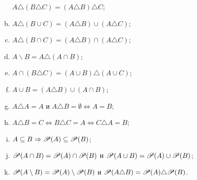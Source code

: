 \begin{problem}
\begin{enumerate}[a)]
    $A\triangle(B\triangle C) = (A\triangle B)\triangle C$;
  \item
    $A \triangle (B \cup C) = (A \triangle B) \cup (A \triangle C)$;
  \item
    $A \triangle (B \cap C) = (A \triangle B) \cap (A \triangle C)$;
  \item
    $A\backslash B = A\triangle(A\cap B)$;
  \item
    $A\cap(B\triangle C) = (A\cup B)\triangle(A\cup C)$;
  \item
    $A\cup B = (A\triangle B)\cup(A\cap B)$;
  \item
    $A\triangle A = A$ и $A\triangle B = \emptyset \iff A = B$;
  \item
    $A\triangle B = C \iff B\triangle C = A \iff C\triangle A = B$;
  \item 
    $A\subseteq B \Rightarrow \mathscr{P}(A) \subseteq \mathscr{P}(B)$;
  \item
    $\mathscr{P}(A\cap B) = \mathscr{P}(A) \cap \mathscr{P}(B)$ и $\mathscr{P}(A\cup B) = \mathscr{P}(A) \cup \mathscr{P}(B)$;
  \item
    $\mathscr{P}(A\setminus B) = \mathscr{P}(A)\setminus\mathscr{P}(B)$ и $\mathscr{P}(A\triangle B) = \mathscr{P}(A)\triangle \mathscr{P}(B)$.
  \end{enumerate}
\end{problem}

